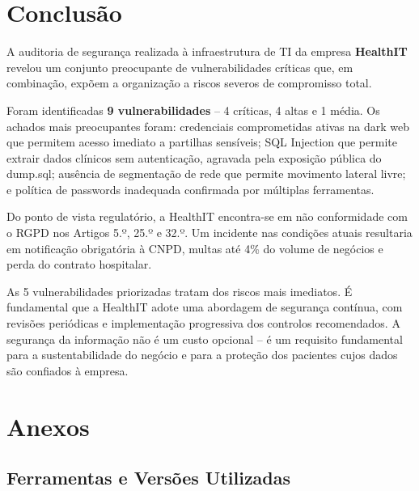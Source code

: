 \documentclass[12pt, a4paper]{report}
\begin{document}
\chapter{Conclusão}

A auditoria de segurança realizada à infraestrutura de TI da empresa \textbf{HealthIT}
revelou um conjunto preocupante de vulnerabilidades críticas que, em combinação, expõem
a organização a riscos severos de compromisso total.

Foram identificadas \textbf{9 vulnerabilidades} -- 4 críticas, 4 altas e 1 média. Os achados
mais preocupantes foram: credenciais comprometidas ativas na dark web que permitem acesso
imediato a partilhas sensíveis; SQL Injection que permite extrair dados clínicos sem
autenticação, agravada pela exposição pública do dump.sql; ausência de segmentação de rede
que permite movimento lateral livre; e política de passwords inadequada confirmada por
múltiplas ferramentas.

Do ponto de vista regulatório, a HealthIT encontra-se em não conformidade com o RGPD nos
Artigos 5.º, 25.º e 32.º. Um incidente nas condições atuais resultaria em notificação
obrigatória à CNPD, multas até 4\% do volume de negócios e perda do contrato hospitalar.

As 5 vulnerabilidades priorizadas tratam dos riscos mais imediatos. É fundamental que a
HealthIT adote uma abordagem de segurança contínua, com revisões periódicas e implementação
progressiva dos controlos recomendados. A segurança da informação não é um custo opcional
-- é um requisito fundamental para a sustentabilidade do negócio e para a proteção dos
pacientes cujos dados são confiados à empresa.

\appendix
\chapter{Anexos}

\section{Ferramentas e Versões Utilizadas}
\end{document}
